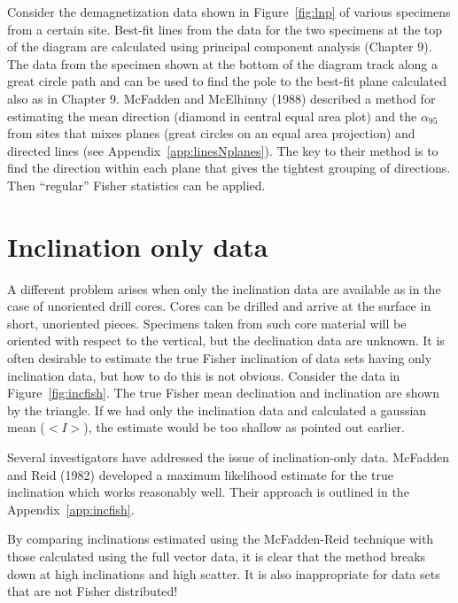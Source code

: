  Consider the demagnetization data  shown in
Figure~\ref{fig:lnp}  of various specimens from a certain site.
Best-fit lines from the data for
 the two specimens at the top of the diagram are calculated using
%
principal component analysis (Chapter 9). 
The data from the specimen shown at the bottom of the diagram
track along a  great circle path and can be used  to
find the pole to the  best-fit plane calculated also  as in Chapter  9.
 McFadden and  McElhinny (1988)  \nocite{mcfadden88}
 described a method for
estimating the mean direction (diamond in central equal area plot) and the $\alpha_{95}$ from sites that mixes planes
(great circles on an equal area projection) and directed lines (see Appendix~\ref{app:linesNplanes}).  The key to their method is to find the direction within each plane that gives the tightest grouping of directions.  Then ``regular'' Fisher statistics can be applied. 






\section{Inclination only data}

A different problem arises when only the inclination data are available as in the
case of unoriented drill cores.  Cores can be drilled and arrive at the surface
in short, unoriented pieces.  Specimens taken from such core material will be oriented
with respect to the vertical, but the  declination data are unknown.  It is
often desirable to estimate the true Fisher inclination  of data sets having only
inclination data, but how to do this is not obvious.  Consider the data in 
Figure~\ref{fig:incfish}.  The true Fisher mean declination and inclination are
shown by the triangle.  If we had only the inclination data and calculated a gaussian
mean ($< I >$), the estimate would be too shallow as pointed out earlier.



Several investigators have addressed the issue of inclination-only data.  
McFadden and Reid (1982) developed a maximum likelihood 
estimate for the true inclination which works reasonably well.
 Their approach is outlined in the
Appendix~\ref{app:incfish}.


By comparing inclinations estimated using the 
McFadden-Reid technique with those
calculated using the full vector data, it is clear that the method breaks
down at high inclinations and high scatter.  It is also inappropriate for data sets that are not Fisher distributed!   




